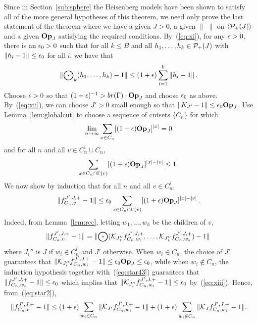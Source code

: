 Since in Section~\ref{sub:sphere}
the Heisenberg models have been shown to satisfy all of
the more general hypotheses of this theorem, we need only prove the last
statement of the theorem where we have a given $J>0$, a given $\|\,\,\|$
on $\langle{\cal P}_+(J)\rangle$ and a given ${\bf Op}_J$ satisfying the required conditions.
By~(\ref{eq:xi}), for any $\epsilon > 0$, there is
an $\epsilon_0 > 0$ such that for all $k \leq B$ and all $h_1 , \ldots , 
h_k \in {\cal P}_+(J)$ with $\|h_i - 1\| \leq \epsilon_0$ for all $i$, we have that
\begin{equation} \label{eq:star2}
\| {\bigodot}_k (h_1 , \ldots , h_k) - 1 \| \leq (1 + \epsilon) \sum_{i=1}^k
   \|h_i - 1\| \, .
\end{equation}
Choose $\epsilon > 0$ so that 
$(1 + \epsilon)^{-1} > \textstyle {br}  (\Gamma) \cdot {\bf Op}_J$ and 
choose $\epsilon_0$ as above.
By~(\ref{eq:xii}), we can choose $J'>0$ small enough 
so that $\| K_{J'} -1 \| \leq \epsilon_0 {\bf Op}_J$.
Use Lemma~\ref{lem:globalcut} to choose
a sequence of cutsets $\{ C_n \}$ for which 
$$\lim_{n \rightarrow \infty} \sum_{x \in C_n} [(1 + \epsilon) 
   {\bf Op}_J ]^{|x|} = 0$$
and for all $n$ and all $v \in C_n^i \cup C_n$,
\begin{equation} \label{eq:star43}
\sum_{x \in C_n \cap \Gamma (v)} 
[(1 + \epsilon) {\bf Op}_J ]^{|x| - |v|} \leq 1.
\end{equation}
We now show by induction that for all $n$ and all $v \in C_n^i$, 
\begin{equation} \label{eq:ind}
\|f^{J' ,J, +}_{C_n , v} - 1\| \leq \epsilon_0 \sum_{x \in C_n \cap \Gamma (v)} 
   [(1 + \epsilon) {\bf Op}_J ]^{|x| - |v|} \, .
\end{equation}
Indeed, from Lemma~\ref{lem:rec}, letting $w_1 , \ldots , w_k$
be the children of $v$,
$$\|f^{J',J , +}_{C_n , v} - 1\| 
= \| {\bigodot} ({\cal K}_{J_1''} f^{J',J , +}_{C_n , w_1},
   \ldots , {\cal K}_{J_k''} f^{J',J , +}_{C_n , w_k}) - 1 \| \, $$
where $J_i''$ is $J$ if $w_i\in C_n^i$ and $J'$ otherwise.
When $w_i \in C_n$, the choice of $J'$ guarantees that 
$\|{\cal K}_{J_i''} f^{J',J , +}_{C_n , w_i} - 1\| \leq \epsilon_0{\bf Op}_J\leq \epsilon_0$, 
while when $w_i \notin C_n$, 
the induction hypothesis together with~(\ref{eq:star43}) guarantees that
$\|f^{J',J , +}_{C_n , w_i}    - 1\| \le \epsilon_0$ which implies that
$\|{\cal K}_{J_i''} f^{J',J , +}_{C_n , w_i}    - 1\| \le \epsilon_0$ 
by~(\ref{eq:xiii}). Hence, from~(\ref{eq:star2}), 
$$\|f^{J',J , +}_{C_n , v} - 1\| \leq 
   (1 + \epsilon) \sum_{w_i \in C_n} \| {\cal K}_{J'} f^{J',J , +}_{C_n , w_i} - 1 \| 
   + (1 + \epsilon) \sum_{w_i \notin C_n} 
\|{\cal K}_J f^{J',J , +}_{C_n , w_i}    - 1\|.$$

